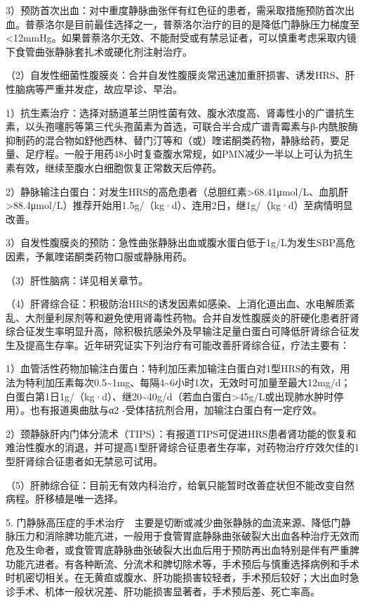 3）预防首次出血：对中重度静脉曲张伴有红色征的患者，需采取措施预防首次出血。普萘洛尔是目前最佳选择之一，普萘洛尔治疗的目的是降低门静脉压力梯度至\textless{}12mmHg。如果普萘洛尔无效、不能耐受或有禁忌证者，可以慎重考虑采取内镜下食管曲张静脉套扎术或硬化剂注射治疗。

（2）自发性细菌性腹膜炎：合并自发性腹膜炎常迅速加重肝损害、诱发HRS、肝性脑病等严重并发症，故应早诊、早治。

1）抗生素治疗：选择对肠道革兰阴性菌有效、腹水浓度高、肾毒性小的广谱抗生素，以头孢噻肟等第三代头孢菌素为首选，可联合半合成广谱青霉素与β-内酰胺酶抑制药的混合物如舒他西林、替门汀等和（或）喹诺酮类药物，静脉给药，要足量、足疗程。一般于用药48小时复查腹水常规，如PMN减少一半以上可认为抗生素有效，继续至腹水白细胞恢复正常数天后停药。

2）静脉输注白蛋白：对发生HRS的高危患者（总胆红素\textgreater{}68.41μmol/L、血肌酐\textgreater{}88.4μmol/L）推荐开始用1.5g/（kg·d）、连用2日，继1g/（kg·d）至病情明显改善。

3）自发性腹膜炎的预防：急性曲张静脉出血或腹水蛋白低于1g/L为发生SBP高危因素，予氟喹诺酮类药物口服或静脉用药。

（3）肝性脑病：详见相关章节。

（4）肝肾综合征：积极防治HRS的诱发因素如感染、上消化道出血、水电解质紊乱、大剂量利尿剂等和避免使用肾毒性药物。合并自发性腹膜炎的肝硬化患者肝肾综合征发生率明显升高，除积极抗感染外及早输注足量白蛋白可降低肝肾综合征发生及提高生存率。近年研究证实下列治疗有可能改善肝肾综合征，疗法主要有：

1）血管活性药物加输注白蛋白：特利加压素加输注白蛋白对1型HRS的有效，用法为特利加压素每次0.5\textasciitilde{}1mg、每隔4\textasciitilde{}6小时1次，无效时可加量至最大12mg/d；白蛋白第1日1g/（kg·d）、继20\textasciitilde{}40g/d（若血白蛋白\textgreater{}45g/L或出现肺水肿时停用）。也有报道奥曲肽与α{2}
-受体拮抗剂合用，加输注白蛋白有一定疗效。

2）颈静脉肝内门体分流术（TIPS）：有报道TIPS可促进HRS患者肾功能的恢复和难治性腹水的消退，并可提高1型肝肾综合征患者生存率，对药物治疗疗效欠佳的1型肝肾综合征患者如无禁忌可试用。

（5）肝肺综合征：目前无有效内科治疗，给氧只能暂时改善症状但不能改变自然病程。肝移植是唯一选择。

5.
门静脉高压症的手术治疗　主要是切断或减少曲张静脉的血流来源、降低门静脉压力和消除脾功能亢进，一般用于食管胃底静脉曲张破裂大出血各种治疗无效而危及生命者，或食管胃底静脉曲张破裂大出血后用于预防再出血特别是伴有严重脾功能亢进者。有各种断流、分流术和脾切除术等，手术预后与慎重选择病例和手术时机密切相关。在无黄疸或腹水、肝功能损害较轻者，手术预后较好；大出血时急诊手术、机体一般状况差、肝功能损害显著者，手术预后差、死亡率高。

